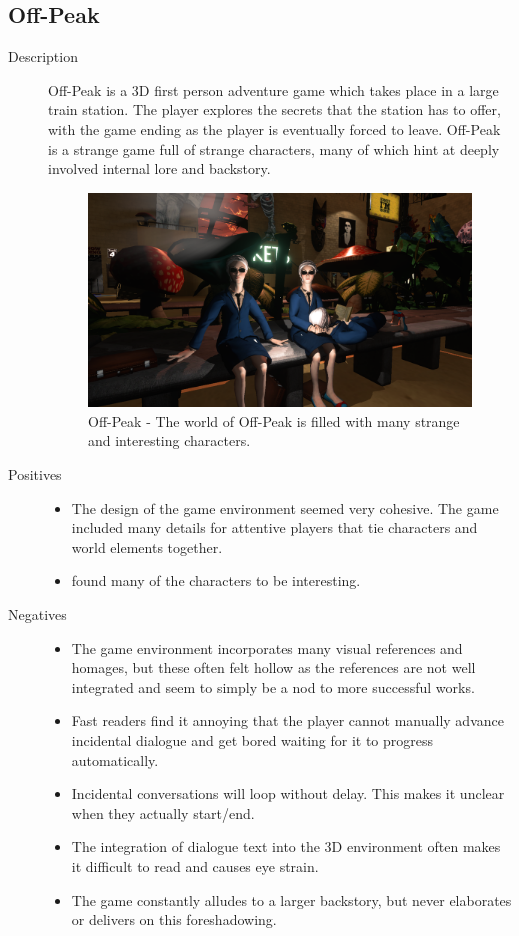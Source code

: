 \subsection{Off-Peak}
\begin{description}
\item[Description]{Off-Peak is a 3D first person adventure game which takes place in a large train station. The player explores the secrets that the station has to offer, with the game ending as the player is eventually forced to leave. Off-Peak is a strange game full of strange characters, many of which hint at deeply involved internal lore and backstory.

\begin{figure}[htb]
	\centering\includegraphics[width=.25\linewidth]{images/game_offpeak}
	\caption{Off-Peak - The world of Off-Peak is filled with many strange and interesting characters.}
	\label{fig:offpeak}
\end{figure}}
\item[Positives]{
\begin{itemize}
\item{The design of the game environment seemed very cohesive. The game included many details for attentive players that tie characters and world elements together.}
\item{\ourteam{} found many of the characters to be interesting.}
\end{itemize}
}
\item[Negatives]{
\begin{itemize}
\item{The game environment incorporates many visual references and homages, but these often felt hollow as the references are not well integrated and seem to simply be a nod to more successful works.}
\item{Fast readers find it annoying that the player cannot manually advance incidental dialogue and get bored waiting for it to progress automatically.}
\item{Incidental conversations will loop without delay. This makes it unclear when they actually start/end.}
\item{The integration of dialogue text into the 3D environment often makes it difficult to read and causes eye strain.}
\item{The game constantly alludes to a larger backstory, but never elaborates or delivers on this foreshadowing.}

\end{itemize}}
\end{description}
